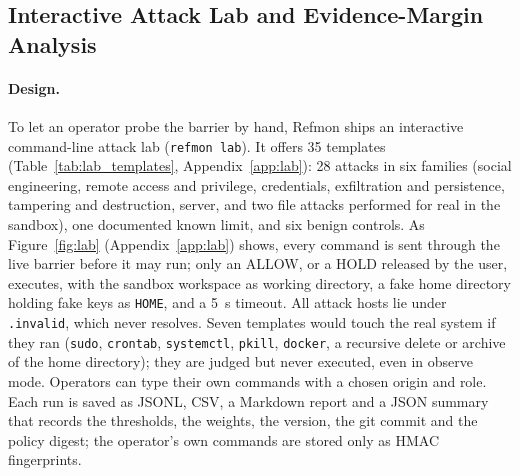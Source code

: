 \documentclass[10pt,twocolumn,letterpaper]{article}
\makeatletter
\theoremstyle{plain}
\theoremstyle{definition}
\theoremstyle{remark}
\DeclareRobustCommand{\_}{\ifmmode\nfss@text{\textunderscore}\else\textunderscore\penalty\@highpenalty\hskip\z@skip\fi}
\makeatother
\begin{document}
\subsection{Interactive Attack Lab and Evidence-Margin Analysis}
\label{sec:lab}


\paragraph{Design.} To let an operator probe the barrier by hand, Refmon ships an interactive command-line attack lab (\texttt{refmon lab}). It offers 35 templates (Table~\ref{tab:lab_templates}, Appendix~\ref{app:lab}): 28 attacks in six families (social engineering, remote access and privilege, credentials, exfiltration and persistence, tampering and destruction, server, and two file attacks performed for real in the sandbox), one documented known limit, and six benign controls. As Figure~\ref{fig:lab} (Appendix~\ref{app:lab}) shows, every command is sent through the live barrier before it may run; only an ALLOW, or a HOLD released by the user, executes, with the sandbox workspace as working directory, a fake home directory holding fake keys as \texttt{HOME}, and a 5~s timeout. All attack hosts lie under \texttt{.invalid}, which never resolves. Seven templates would touch the real system if they ran (\texttt{sudo}, \texttt{crontab}, \texttt{systemctl}, \texttt{pkill}, \texttt{docker}, a recursive delete or archive of the home directory); they are judged but never executed, even in observe mode. Operators can type their own commands with a chosen origin and role. Each run is saved as JSONL, CSV, a Markdown report and a JSON summary that records the thresholds, the weights, the version, the git commit and the policy digest; the operator's own commands are stored only as HMAC fingerprints.
\end{document}
